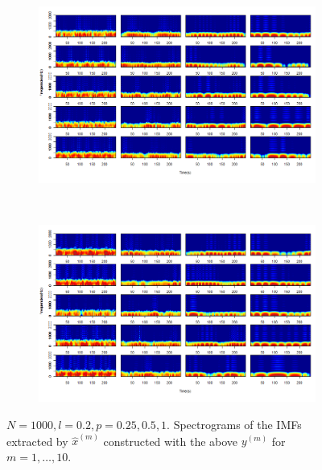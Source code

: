\documentclass[11pt, a4paper]{article} %
\begin{document}
\begin{figure}[H]
\begin{subfigure}{1.1\textwidth}
  \centering
  \includegraphics[width=\linewidth]{spectro_N1000_l020_IMF_1_5.png}
  \label{fig:sfig1}
\end{subfigure}\\
\begin{subfigure}{1.1\textwidth}
  \centering
  \includegraphics[width=\linewidth]{spectro_N1000_l020_IMF_6_10.png}
  \label{fig:sfig2}
\end{subfigure}
\caption{$N = 1000, l = 0.2, p = 0.25, 0.5, 1$. Spectrograms of the IMFs extracted by $\hat{x}^{(m)}$ constructed with the above $y^{(m)}$ for $m = 1, \dots, 10$.}
\label{fig:fig}
\end{figure}
\restoregeometry


\end{document}
